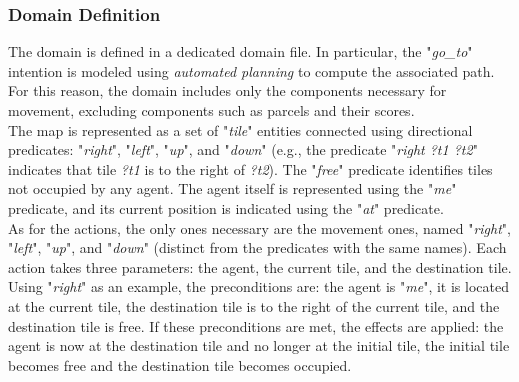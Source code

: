         \subsubsection{Domain Definition}
            The domain is defined in a dedicated domain file. In particular, the "\textit{go\_to}" intention is modeled using \textit{automated planning} to compute the associated path. For this reason, the domain includes only the components necessary for movement, excluding components such as parcels and their scores.
            \medskip\\
            The map is represented as a set of "\textit{tile}" entities connected using directional predicates: "\textit{right}", "\textit{left}", "\textit{up}", and "\textit{down}" (e.g., the predicate "\textit{right ?t1 ?t2}" indicates that tile \textit{?t1} is to the right of \textit{?t2}). The "\textit{free}" predicate identifies tiles not occupied by any agent. The agent itself is represented using the "\textit{me}" predicate, and its current position is indicated using the "\textit{at}" predicate.
            \medskip\\
            As for the actions, the only ones necessary are the movement ones, named "\textit{right}", "\textit{left}", "\textit{up}", and "\textit{down}" (distinct from the predicates with the same names). Each action takes three parameters: the agent, the current tile, and the destination tile. Using "\textit{right}" as an example, the preconditions are: the agent is "\textit{me}", it is located at the current tile, the destination tile is to the right of the current tile, and the destination tile is free. If these preconditions are met, the effects are applied: the agent is now at the destination tile and no longer at the initial tile, the initial tile becomes free and the destination tile becomes occupied.

